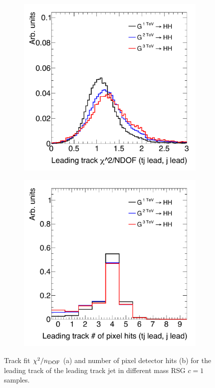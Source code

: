 \begin{figure}[h!]
  \centering
  \captionsetup{justification=centering}

   \begin{subfigure}[t]{0.5\textwidth}
        \centering
        \includegraphics[width=\textwidth]{figures/LeadTrack_Chi2NDF}
        \caption{}
    \end{subfigure}%
    \begin{subfigure}[t]{0.5\textwidth}
        \centering
        \includegraphics[width=\textwidth]{figures/LeadTrack_NPixhits}
        \caption{}
    \end{subfigure}

   \caption{Track fit $\chi^2/n_{\rm DOF}$ (a) and number of pixel detector hits (b) for the leading track of the leading track jet in different mass RSG $c=1$ samples.}
  \label{fig:LeadTrack}
\end{figure}
